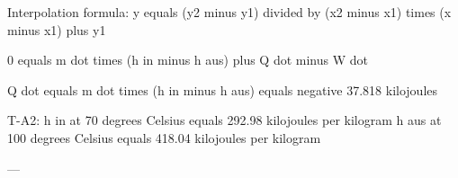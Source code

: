 Interpolation formula:  
y equals (y2 minus y1) divided by (x2 minus x1) times (x minus x1) plus y1  

0 equals m dot times (h in minus h aus) plus Q dot minus W dot  

Q dot equals m dot times (h in minus h aus) equals negative 37.818 kilojoules  

T-A2:  
h in at 70 degrees Celsius equals 292.98 kilojoules per kilogram  
h aus at 100 degrees Celsius equals 418.04 kilojoules per kilogram  

---